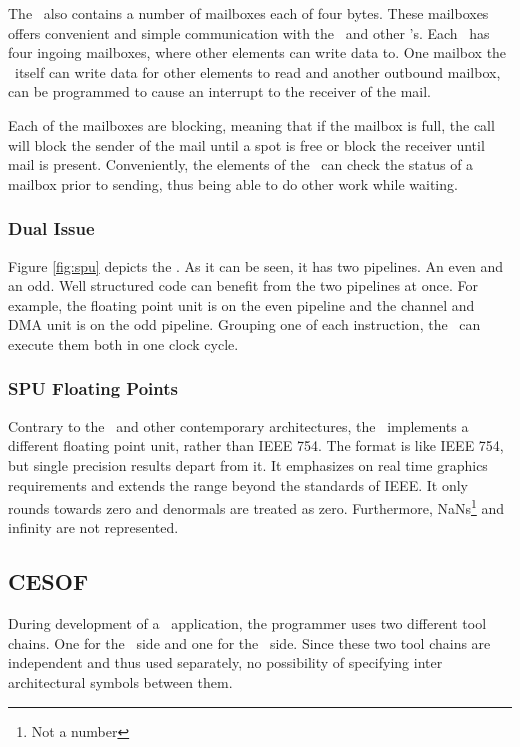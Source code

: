 The \SPE\ also contains a number of mailboxes each of four
bytes. These mailboxes offers convenient and simple communication with
the \PPE\ and other \SPE{}'s. Each \SPE\ has four ingoing mailboxes,
where other elements can write data to. One mailbox the \SPE\ itself
can write data for other elements to read and another outbound
mailbox, can be programmed to cause an interrupt to the receiver of
the mail.

Each of the mailboxes are blocking, meaning that if the mailbox is
full, the call will block the sender of the mail until a spot is free
or block the receiver until mail is
present\cite{cellhandbook}. Conveniently, the elements of the \EIB\
can check the status of a mailbox prior to sending, thus being able to
do other work while waiting.

\subsubsection{Dual Issue}

Figure \ref{fig:spu} depicts the \SPU{}. As it can be seen, it has two
pipelines. An even and an odd. Well structured code can benefit from
the two pipelines at once. For example, the floating point unit is on
the even pipeline and the channel and DMA unit is on the odd pipeline.
Grouping one of each instruction, the \SPU\ can execute them both in
one clock cycle.

\subsubsection{SPU Floating Points}
\label{sec:spufloat}

Contrary to the \PPE\ and other contemporary architectures, the \SPU\
implements a different floating point unit, rather than IEEE
754\cite{cellhandbook}. The format is like IEEE 754, but single
precision results depart from it. It emphasizes on real time graphics
requirements and extends the range beyond the standards of IEEE. It
only rounds towards zero and denormals are treated as
zero. Furthermore, NaNs\footnote{Not a number} and infinity are not
represented.

\subsection{CESOF}
\label{sec:cesof}

During development of a \CBE\ application, the programmer uses two
different tool chains. One for the \PPE\ side and one for the \SPE\
side. Since these two tool chains are independent and thus used
separately, no possibility of specifying inter architectural symbols
between them.

